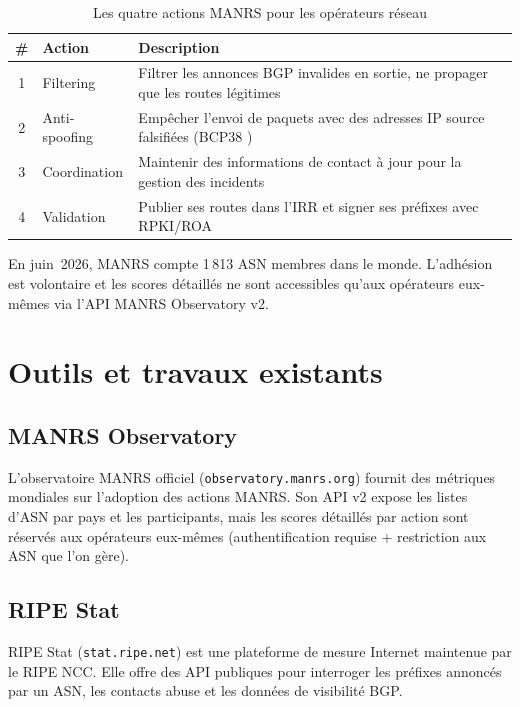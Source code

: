 \documentclass{eneam}
\begin{document}
\begin{table}[H]
\caption{Les quatre actions MANRS pour les opérateurs réseau}
\centering
\begin{tabularx}{\textwidth}{|c|l|X|}
\hline
\textbf{\#} & \textbf{Action} & \textbf{Description} \\
\hline
1 & Filtering & Filtrer les annonces BGP invalides en sortie, ne propager que les routes légitimes \\
\hline
2 & Anti-spoofing & Empêcher l'envoi de paquets avec des adresses IP source falsifiées (BCP38 \cite{RFC2827}) \\
\hline
3 & Coordination & Maintenir des informations de contact à jour pour la gestion des incidents \\
\hline
4 & Validation & Publier ses routes dans l'IRR et signer ses préfixes avec RPKI/ROA \\
\hline
\end{tabularx}
\end{table}

En juin~2026, MANRS compte 1\,813 ASN membres dans le monde. L'adhésion est volontaire et les scores détaillés ne sont accessibles qu'aux opérateurs eux-mêmes via l'API MANRS Observatory v2.

\section{Outils et travaux existants}

\subsection{MANRS Observatory}

L'observatoire MANRS officiel (\texttt{observatory.manrs.org}) fournit des métriques mondiales sur l'adoption des actions MANRS. Son API v2 expose les listes d'ASN par pays et les participants, mais les scores détaillés par action sont réservés aux opérateurs eux-mêmes (authentification requise + restriction aux ASN que l'on gère).

\subsection{RIPE Stat}

RIPE Stat (\texttt{stat.ripe.net}) est une plateforme de mesure Internet maintenue par le RIPE NCC. Elle offre des API publiques pour interroger les préfixes annoncés par un ASN, les contacts abuse et les données de visibilité BGP.
\end{document}
